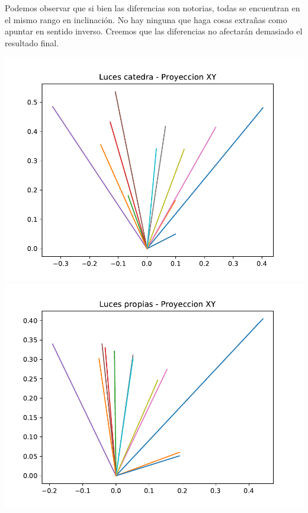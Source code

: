 Podemos observar que si bien las diferencias son notorias, todas se encuentran en el mismo rango en inclinación. No hay ninguna que haga cosas extrañas como apuntar en sentido inverso. Creemos que las diferencias no afectarán demasiado el resultado final.

{\centering
    \includegraphics[scale=0.8]{informe/imagenes/lucesCatedraProyeccionXY.pdf} \\
}
{\centering
    \includegraphics[scale=0.8]{informe/imagenes/lucesPropiasProyeccionXY.pdf} \\
}

